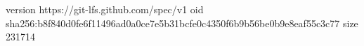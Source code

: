 version https://git-lfs.github.com/spec/v1
oid sha256:b8f840d0fe6f11496ad0a0ce7e5b31bcfe0c4350f6b9b56be0b9e8eaf55c3c77
size 231714
